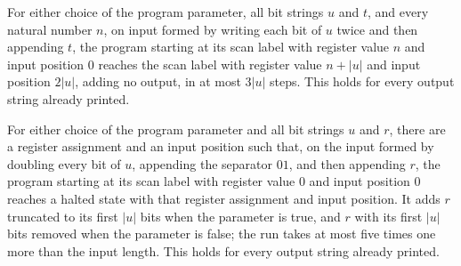 \begin{theorem}
\label{Complexity.PrefixByLength.goes_doubled}
\leanok
{}
For either choice of the program parameter, all bit strings $u$ and $t$, and every
natural number $n$, on input formed by writing each bit of $u$ twice and then appending
$t$, the program starting at its scan label with register value $n$ and input position
$0$ reaches the scan label with register value $n+|u|$ and input position $2|u|$, adding
no output, in at most $3|u|$ steps. This holds for every output string already printed.
\end{theorem}

\begin{theorem}
\label{Complexity.PrefixByLength.goes_pair}
\leanok
{}
For either choice of the program parameter and all bit strings $u$ and $r$, there are a
register assignment and an input position such that, on the input formed by doubling
every bit of $u$, appending the separator $01$, and then appending $r$, the program
starting at its scan label with register value $0$ and input position $0$ reaches a
halted state with that register assignment and input position. It adds $r$ truncated to
its first $|u|$ bits when the parameter is true, and $r$ with its first $|u|$ bits
removed when the parameter is false; the run takes at most five times one more than the
input length. This holds for every output string already printed.
\end{theorem}

